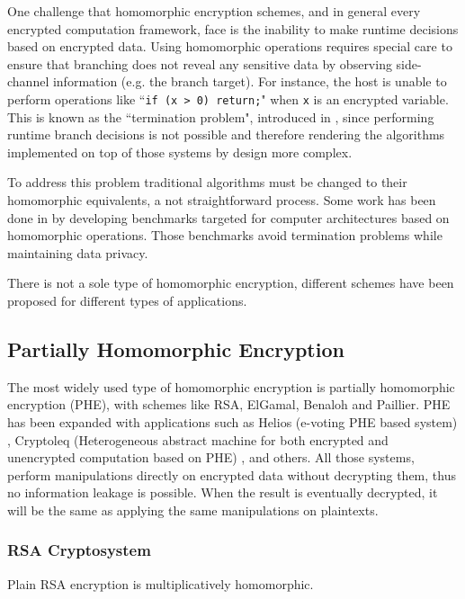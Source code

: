 One challenge that homomorphic encryption schemes, and in general every encrypted computation framework, face is the inability to make runtime decisions based on encrypted data.
Using homomorphic operations requires special care to ensure that branching does not reveal any sensitive data by observing side-channel information (e.g. the branch target).
For instance, the host is unable to perform operations like ``\texttt{if (x > 0) return;}" when \texttt{x} is an encrypted variable.
This is known as the ``termination problem", introduced in \cite{brenner2011secret}, since performing runtime branch decisions is not possible and therefore rendering the algorithms implemented on top of those systems by design more complex.


To address this problem traditional algorithms must be changed to their homomorphic equivalents, a not straightforward process.
Some work has been done in \cite{mouris2018terminator} by developing benchmarks targeted for computer architectures based on homomorphic operations.
Those benchmarks avoid termination problems while maintaining data privacy.


There is not a sole type of homomorphic encryption, different schemes have been proposed for different types of applications.


\subsection{Partially Homomorphic Encryption}\label{ss:phe}
The most widely used type of homomorphic encryption is partially homomorphic encryption (PHE), with schemes like RSA, ElGamal, Benaloh and Paillier.
PHE has been expanded with applications such as Helios (e-voting PHE based system) \cite{adida2008helios}, Cryptoleq (Heterogeneous abstract machine for both encrypted and unencrypted computation based on PHE) \cite{mazonka2016cryptoleq}, and others.
All those systems, perform manipulations directly on encrypted data without decrypting them, thus no information leakage is possible.
When the result is eventually decrypted, it will be the same as applying the same manipulations on plaintexts.

\subsubsection{RSA Cryptosystem}\label{ss:rsa}
Plain RSA encryption is multiplicatively homomorphic.


